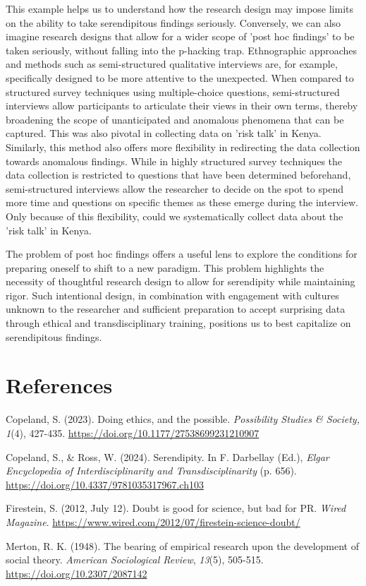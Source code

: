 \documentclass[authordate, commentary]{jote-new-article}
\begin{document}
	This example helps us to understand how the research design may impose limits on the ability to take serendipitous findings seriously. Conversely, we can also imagine research designs that allow for a wider scope of 'post hoc findings' to be taken seriously, without falling into the p-hacking trap. Ethnographic approaches and methods such as semi-structured qualitative interviews are, for example, specifically designed to be more attentive to the unexpected. When compared to structured survey techniques using multiple-choice questions, semi-structured interviews allow participants to articulate their views in their own terms, thereby broadening the scope of unanticipated and anomalous phenomena that can be captured. This was also pivotal in collecting data on 'risk talk' in Kenya. Similarly, this method also offers more flexibility in redirecting the data collection towards anomalous findings. While in highly structured survey techniques the data collection is restricted to questions that have been determined beforehand, semi-structured interviews allow the researcher to decide on the spot to spend more time and questions on specific themes as these emerge during the interview. Only because of this flexibility, could we systematically collect data about the 'risk talk' in Kenya.


	The problem of post hoc findings offers a useful lens to explore the conditions for preparing oneself to shift to a new paradigm. This problem highlights the necessity of thoughtful research design to allow for serendipity while maintaining rigor. Such intentional design, in combination with engagement with cultures unknown to the researcher and sufficient preparation to accept surprising data through ethical and transdisciplinary training, positions us to best capitalize on serendipitous findings.





	\section{References}




	Copeland, S. (2023). Doing ethics, and the possible. \emph{Possibility Studies \& Society,} \emph{1}(4), 427-435. \url{https://doi.org/10.1177/27538699231210907}


	Copeland, S., \& Ross, W. (2024). Serendipity. In F. Darbellay (Ed.), \emph{Elgar Encyclopedia of Interdisciplinarity and Transdisciplinarity }(p. 656). \url{https://doi.org/10.4337/9781035317967.ch103}

	Firestein, S. (2012, July 12). Doubt is good for science, but bad for PR. \emph{Wired Magazine}. \url{https://www.wired.com/2012/07/firestein-science-doubt/}

	Merton, R. K. (1948). The bearing of empirical research upon the development of social theory. \emph{American Sociological Review}, \emph{13}(5), 505-515. \url{https://doi.org/10.2307/2087142}
\end{document}
